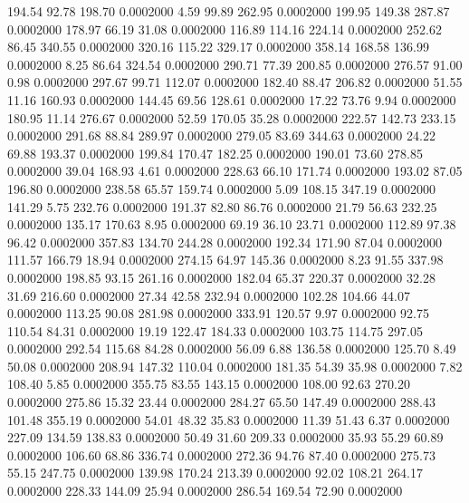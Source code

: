  194.54   92.78  198.70   0.0002000
   4.59   99.89  262.95   0.0002000
 199.95  149.38  287.87   0.0002000
 178.97   66.19   31.08   0.0002000
 116.89  114.16  224.14   0.0002000
 252.62   86.45  340.55   0.0002000
 320.16  115.22  329.17   0.0002000
 358.14  168.58  136.99   0.0002000
   8.25   86.64  324.54   0.0002000
 290.71   77.39  200.85   0.0002000
 276.57   91.00    0.98   0.0002000
 297.67   99.71  112.07   0.0002000
 182.40   88.47  206.82   0.0002000
  51.55   11.16  160.93   0.0002000
 144.45   69.56  128.61   0.0002000
  17.22   73.76    9.94   0.0002000
 180.95   11.14  276.67   0.0002000
  52.59  170.05   35.28   0.0002000
 222.57  142.73  233.15   0.0002000
 291.68   88.84  289.97   0.0002000
 279.05   83.69  344.63   0.0002000
  24.22   69.88  193.37   0.0002000
 199.84  170.47  182.25   0.0002000
 190.01   73.60  278.85   0.0002000
  39.04  168.93    4.61   0.0002000
 228.63   66.10  171.74   0.0002000
 193.02   87.05  196.80   0.0002000
 238.58   65.57  159.74   0.0002000
   5.09  108.15  347.19   0.0002000
 141.29    5.75  232.76   0.0002000
 191.37   82.80   86.76   0.0002000
  21.79   56.63  232.25   0.0002000
 135.17  170.63    8.95   0.0002000
  69.19   36.10   23.71   0.0002000
 112.89   97.38   96.42   0.0002000
 357.83  134.70  244.28   0.0002000
 192.34  171.90   87.04   0.0002000
 111.57  166.79   18.94   0.0002000
 274.15   64.97  145.36   0.0002000
   8.23   91.55  337.98   0.0002000
 198.85   93.15  261.16   0.0002000
 182.04   65.37  220.37   0.0002000
  32.28   31.69  216.60   0.0002000
  27.34   42.58  232.94   0.0002000
 102.28  104.66   44.07   0.0002000
 113.25   90.08  281.98   0.0002000
 333.91  120.57    9.97   0.0002000
  92.75  110.54   84.31   0.0002000
  19.19  122.47  184.33   0.0002000
 103.75  114.75  297.05   0.0002000
 292.54  115.68   84.28   0.0002000
  56.09    6.88  136.58   0.0002000
 125.70    8.49   50.08   0.0002000
 208.94  147.32  110.04   0.0002000
 181.35   54.39   35.98   0.0002000
   7.82  108.40    5.85   0.0002000
 355.75   83.55  143.15   0.0002000
 108.00   92.63  270.20   0.0002000
 275.86   15.32   23.44   0.0002000
 284.27   65.50  147.49   0.0002000
 288.43  101.48  355.19   0.0002000
  54.01   48.32   35.83   0.0002000
  11.39   51.43    6.37   0.0002000
 227.09  134.59  138.83   0.0002000
  50.49   31.60  209.33   0.0002000
  35.93   55.29   60.89   0.0002000
 106.60   68.86  336.74   0.0002000
 272.36   94.76   87.40   0.0002000
 275.73   55.15  247.75   0.0002000
 139.98  170.24  213.39   0.0002000
  92.02  108.21  264.17   0.0002000
 228.33  144.09   25.94   0.0002000
 286.54  169.54   72.90   0.0002000
